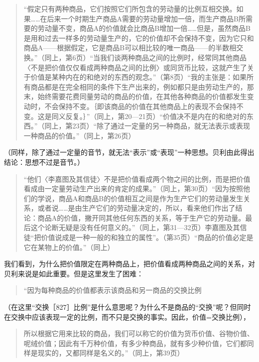 \begin{quote}{“假定只有两种商品，它们按照它们所包含的劳动量的比例互相交换。如果……在后来一个时期生产商品A需要的劳动量增加一倍，而生产商品B所需要的劳动量不变，商品A的价值就会比商品B增加一倍……但是，虽然商品B是用和过去一样多的劳动量生产的，它的价值却不会保持不变，因为它只和商品A——根据假定，它是商品B可以相比较的唯一商品——的半数相交换。”（同上，第6页）“当我们谈两种商品之间的比例时，经常同其他商品〈不是把价值仅仅看成两种商品之间的比例〉或同货币比较，这就产生了关于价值是某种内在的和绝对的东西的观念。”（第8页）“我的主张是：如果所有商品都是在完全相同的条件下生产出来的，例如都只是由劳动生产的，那末，始终需要花费同量劳动的商品的价值，在其他各种商品的价值都发生变动时，不会保持不变。｛即该商品的价值在其他商品上的表现不会保持不变。这是同义反复。｝”（同上，第20—21页）“价值决不是内在的和绝对的东西。”（同上，第23页）“除了通过一定量的另一种商品，就无法表示或表现一种商品的价值。”（同上，第26页）}\end{quote}

（同样，除了通过一定量的音节，就无法“表示”或“表现”一种思想。贝利由此得出结论：思想不过是音节。）

\begin{quote}{“他们〈李嘉图及其信徒〉不是把价值看成两个物之间的比例，而是把价值看成由一定量劳动生产出来的肯定的成果。”（同上，第30页）“因为按照他们的学说，商品A和商品B的价值相互之间是作为生产它们的劳动量发生关系，或者说……是由生产它们的劳动量决定的，所以，看来他们作出了结论：商品A的价值，撇开同其他任何东西的关系，等于生产它的劳动量。最后这个论断无疑是没有任何意义的。”（同上，第31—32页）李嘉图及其信徒“把价值说成是一种一般的和独立的属性”。（第35页）“商品的价值必定是它在某物上的价值。”（同上）}\end{quote}

我们看到，为什么把价值限定在两种商品上，把价值看成两种商品之间的关系，对贝利来说是如此重要。但是这里发生了困难：

\begin{quote}{“因为每种商品的价值都表示该商品和另一商品的交换比例}\end{quote}

（在这里“交换［827］比例”是什么意思呢？为什么不是商品的“交换”呢？但同时在交换中应该表现一定的比例，而不只是交换的事实。因此，价值=交换比例），

\begin{quote}{所以根据它用来比较的商品，我们可以称它的价值为货币价值、谷物价值、呢绒价值；因此有千万种价值，有多少种商品，就有多少种价值，它们都同样是现实的，又都同样是名义的。”（同上，第39页）}\end{quote}

